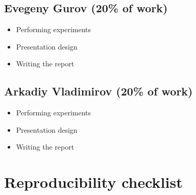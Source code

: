 \documentclass{article}
\begin{document}
\subsection*{Evegeny Gurov (20\% of work)}
\begin{itemize}
    \item Performing experiments
    \item Presentation design
    \item Writing the report
\end{itemize}

\subsection*{Arkadiy Vladimirov (20\% of work)}
\begin{itemize}
    \item Performing experiments
    \item Presentation design
    \item Writing the report
\end{itemize}

\newpage
\section{Reproducibility checklist}
\label{appendix-checklist}
\end{document}
